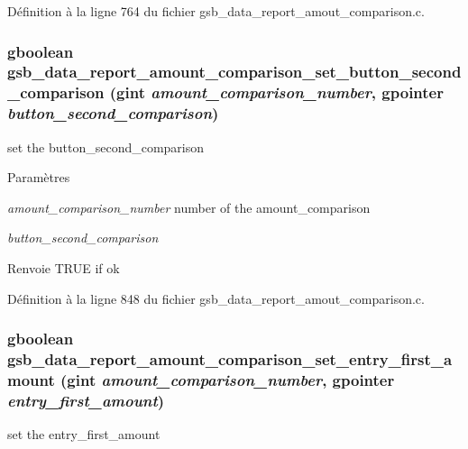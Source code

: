 Définition à la ligne 764 du fichier gsb\_\-data\_\-report\_\-amout\_\-comparison.c.

\subsubsection[{gsb\_\-data\_\-report\_\-amount\_\-comparison\_\-set\_\-button\_\-second\_\-comparison}]{\setlength{\rightskip}{0pt plus 5cm}gboolean gsb\_\-data\_\-report\_\-amount\_\-comparison\_\-set\_\-button\_\-second\_\-comparison (gint {\em amount\_\-comparison\_\-number}, \/  gpointer {\em button\_\-second\_\-comparison})}\label{gsb__data__report__amout__comparison_8c_a050001ae227cac61e5e2bdde14f9503d}
set the button\_\-second\_\-comparison


\begin{DoxyParams}{Paramètres}
\item[{\em amount\_\-comparison\_\-number}]number of the amount\_\-comparison \item[{\em button\_\-second\_\-comparison}]\end{DoxyParams}
\begin{DoxyReturn}{Renvoie}
TRUE if ok 
\end{DoxyReturn}


Définition à la ligne 848 du fichier gsb\_\-data\_\-report\_\-amout\_\-comparison.c.

\subsubsection[{gsb\_\-data\_\-report\_\-amount\_\-comparison\_\-set\_\-entry\_\-first\_\-amount}]{\setlength{\rightskip}{0pt plus 5cm}gboolean gsb\_\-data\_\-report\_\-amount\_\-comparison\_\-set\_\-entry\_\-first\_\-amount (gint {\em amount\_\-comparison\_\-number}, \/  gpointer {\em entry\_\-first\_\-amount})}\label{gsb__data__report__amout__comparison_8c_aa2ae38c4595b77ebea8e9f74cb618298}
set the entry\_\-first\_\-amount


